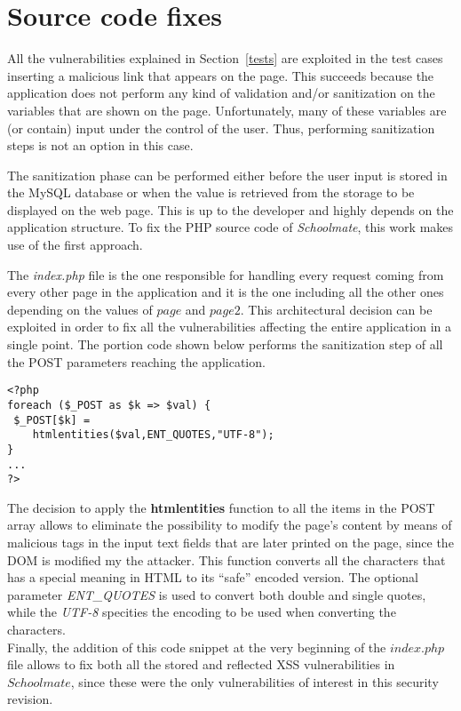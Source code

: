\documentclass{sig-alternate-05-2015}
\begin{document}
\section{Source code fixes}\label{fixes}
All the vulnerabilities explained in Section~\ref{tests} are exploited in the test cases
inserting a malicious link that appears on the page. This succeeds because
the application does not perform any kind of validation and/or sanitization on the variables
that are shown on the page. Unfortunately, many of these variables are (or contain) input
under the control of the user. Thus, performing sanitization steps is not an option in this
case.

The sanitization phase can be performed either before the user input is stored in the
MySQL database or when the value is retrieved from the storage to be displayed on the
web page. This is up to the developer and highly depends on the application structure.
To fix the PHP source code of \emph{Schoolmate}, this work makes use of the first approach.

The \emph{index.php} file is the one responsible for handling every request coming from
every other page in the application and it is the one including all the other ones depending
on the values of $page$ and $page2$.
This architectural decision can be exploited in order
to fix all the vulnerabilities affecting the entire application in a single point.
The portion code shown below performs the sanitization step
of all the POST parameters reaching the application.

\begin{lstlisting}[frame=single, caption={Fixing all the vulnerabilities in index.php}]
<?php
foreach ($_POST as $k => $val) {
 $_POST[$k] =
    htmlentities($val,ENT_QUOTES,"UTF-8");
}
...
?>
\end{lstlisting}

The decision to apply the \textbf{htmlentities} function to all the items in the POST array allows
to eliminate the possibility to modify the page's content by means of malicious tags in the input
text fields that are later printed on the page, since the DOM is modified my the attacker.
This function converts all the characters
that has a special meaning in HTML to its ``safe'' encoded version. The optional parameter
\emph{ENT\_QUOTES} is used to convert both double and single quotes, while the \emph{UTF-8}
specities the encoding to be used when converting the characters.\\
Finally, the addition of this code snippet at the very beginning of the $index.php$ file allows to
fix both all the stored and reflected XSS vulnerabilities in $Schoolmate$, since these were the
only vulnerabilities of interest in this security revision.
\end{document}
